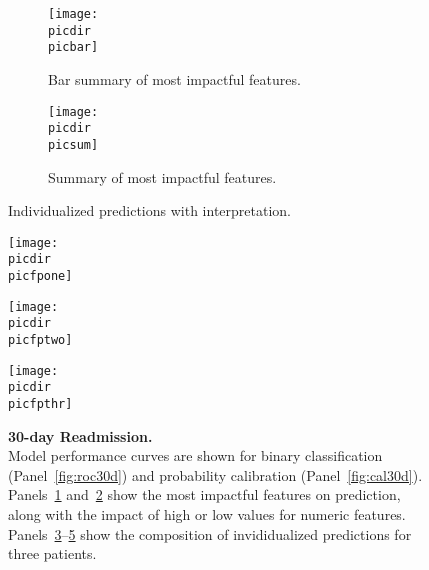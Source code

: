 \begin{figure}
\begin{adjustbox}{minipage={\linewidth},frame}
\begin{subfigure}[t]{.45\linewidth}
    \vspace{2.5mm}
    \centering
    \captionsetup[subfigure]{}
    \caption{Bar summary of most impactful features.}\label{fig:shapsumbar30d}
    \texttt{[image: \\picdir\\picbar]}
\end{subfigure}
\begin{subfigure}[t]{.45\linewidth}
    \vspace{2.5mm}
    \centering
    \captionsetup[subfigure]{}
    \caption{Summary of most impactful features.}\label{fig:shapsum30d}
    \vspace{-2.3mm}
    \texttt{[image: \\picdir\\picsum]}
    \vspace{2.0mm}
\end{subfigure}
\textsf{Individualized predictions with interpretation.}
\vspace{-2.5mm}
\begin{subfigure}[t]{0.1\textwidth}
    \caption{}\label{fig:shapforce30d1}
    \end{subfigure}%
    \begin{minipage}[c]{0.9\textwidth}
    \texttt{[image: \\picdir\\picfpone]}
    \vspace{-2.5mm}
\end{minipage}
\begin{subfigure}[t]{0.1\textwidth}
    \caption{}\label{fig:shapforce30d2}
    \end{subfigure}%
    \begin{minipage}[c]{0.9\textwidth}
    \texttt{[image: \\picdir\\picfptwo]}
    \vspace{-3.5mm}
\end{minipage}
\vspace{-4.5mm}
\begin{subfigure}[t]{0.1\textwidth}
    \caption{}\label{fig:shapforce30d3}
    \end{subfigure}%
    \begin{minipage}[c]{0.9\textwidth}
    \texttt{[image: \\picdir\\picfpthr]}
    \vspace{-2.5mm}
\end{minipage}
\vspace{-2.5mm}

\caption{\textbf{30-day Readmission.} \\
Model performance curves are shown for binary classification (Panel~\ref{fig:roc30d}) and probability calibration (Panel~\ref{fig:cal30d}).
Panels~\ref{fig:shapsumbar30d} and~\ref{fig:shapsum30d} show the most impactful features on prediction, along with the impact of high or low values for numeric features.
Panels~\ref{fig:shapforce30d1}--\ref{fig:shapforce30d3} show the composition of invididualized predictions for three patients. 
}\label{fig:30dreadmission}
\end{adjustbox}
\end{figure}